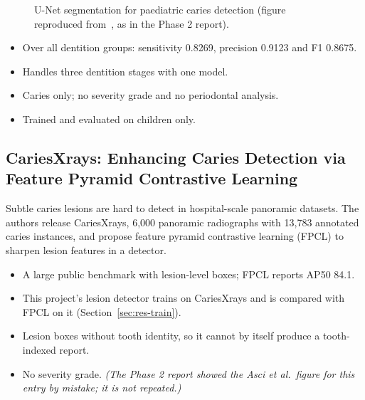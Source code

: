 \begin{figure}[!htbp]
\centering
{}
\caption[U-Net segmentation for paediatric caries detection]{U-Net segmentation for paediatric caries
detection (figure reproduced from~\cite{asci2024deep}, as in the Phase 2 report).}
\label{fig:lit-asci}
\end{figure}

\begin{itemize}
\item Over all dentition groups: sensitivity 0.8269, precision 0.9123 and F1 0.8675.
\item Handles three dentition stages with one model.
\end{itemize}
\begin{itemize}
\item Caries only; no severity grade and no periodontal analysis.
\item Trained and evaluated on children only.
\end{itemize}

\subsection{CariesXrays: Enhancing Caries Detection via Feature Pyramid Contrastive Learning~\cite{chen2024cariesxrays}}
 Subtle caries lesions are hard to detect in hospital-scale panoramic
datasets.
 The authors release CariesXrays, 6,000 panoramic radiographs with 13,783
annotated caries instances, and propose feature pyramid contrastive learning (FPCL) to sharpen lesion
features in a detector.
\begin{itemize}
\item A large public benchmark with lesion-level boxes; FPCL reports AP50 84.1.
\item This project's lesion detector trains on CariesXrays and is compared with FPCL on it
  (Section~\ref{sec:res-train}).
\end{itemize}
\begin{itemize}
\item Lesion boxes without tooth identity, so it cannot by itself produce a tooth-indexed report.
\item No severity grade. \emph{(The Phase 2 report showed the Asci et al.\ figure for this entry by
  mistake; it is not repeated.)}
\end{itemize}


